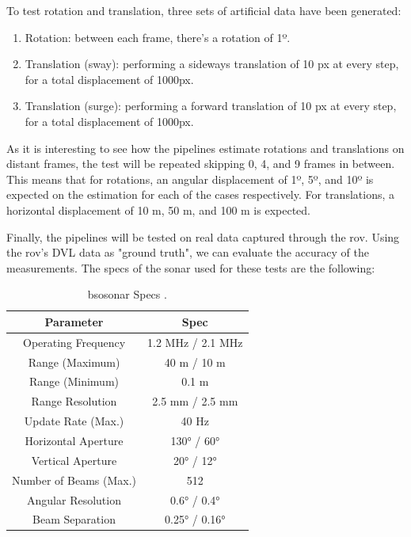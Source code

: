 To test rotation and translation, three sets of artificial data have been generated:

\begin{enumerate}
    \item Rotation: between each frame, there's a rotation of 1º.
    \item Translation (sway): performing a sideways translation of 10 px at every step, for a total displacement of 1000px.
    \item Translation (surge): performing a forward translation of 10 px at every step, for a total displacement of 1000px.
\end{enumerate}


As it is interesting to see how the pipelines estimate rotations and translations on distant frames, the test will be repeated skipping 0, 4, and 9 frames in between. This means that for rotations, an angular displacement of 1º, 5º, and 10º is expected on the estimation for each of the cases respectively. For translations, a horizontal displacement of 10 m, 50 m, and 100 m is expected.

Finally, the pipelines will be tested on real data captured through the \acrshort{rov}. Using the \acrshort{rov}'s DVL data as "ground truth", we can evaluate the accuracy of the measurements. The specs of the sonar used for these tests are the following:


\begin{table}[H]
    \centering
    \begin{tabular}{|c|c|}
        \hline
        \textbf{Parameter} & \textbf{Spec} \\ \hline
        Operating Frequency & 1.2 MHz / 2.1 MHz \\ \hline
        Range (Maximum) & 40 m / 10 m \\ \hline
        Range (Minimum) & 0.1 m \\ \hline
        Range Resolution & 2.5 mm / 2.5 mm \\ \hline
        Update Rate (Max.) & 40 Hz \\ \hline
        Horizontal Aperture & 130° / 60° \\ \hline
        Vertical Aperture & 20° / 12° \\ \hline
        Number of Beams (Max.) & 512 \\ \hline
        Angular Resolution & 0.6° / 0.4° \\ \hline
        Beam Separation & 0.25° / 0.16° \\ \hline
    \end{tabular}
    \caption{\acrlong{bsosonar} Specs \cite{BlueprintSubsea:Specs}.}
    \label{tab:sonar_specs}
\end{table}

